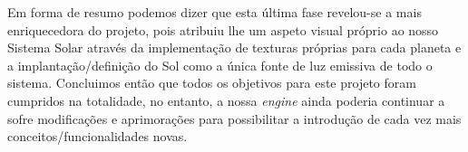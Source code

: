 \documentclass[11pt,a4paper]{report}
\begin{document}
Em forma de resumo podemos dizer que esta última fase revelou-se a mais enriquecedora do projeto, pois atribuiu lhe um aspeto visual próprio ao nosso Sistema Solar através da implementação de texturas próprias para cada planeta e a implantação/definição do Sol como a única fonte de luz emissiva de todo o sistema. Concluimos então que todos os objetivos para este projeto foram cumpridos na totalidade, no entanto, a nossa \emph{engine} ainda poderia continuar a sofre modificações e aprimorações para possibilitar a introdução de cada vez mais conceitos/funcionalidades novas.
\end{document}
